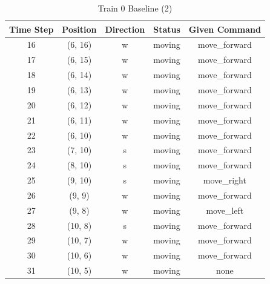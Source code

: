 \begin{table}
\centering
\scriptsize
\caption{Train 0 Baseline (2)}
\label{tab:base0}
\begin{tabular}{c c c c c}
\hline
\textbf{Time Step} & \textbf{Position} & \textbf{Direction} & \textbf{Status} & \textbf{Given Command} \\
\hline
16 & (6, 16) & w & moving & move\_forward \\
17 & (6, 15) & w & moving & move\_forward \\
18 & (6, 14) & w & moving & move\_forward \\
19 & (6, 13) & w & moving & move\_forward \\
20 & (6, 12) & w & moving & move\_forward \\
21 & (6, 11) & w & moving & move\_forward \\
22 & (6, 10) & w & moving & move\_forward \\
23 & (7, 10) & s & moving & move\_forward \\
24 & (8, 10) & s & moving & move\_forward \\
25 & (9, 10) & s & moving & move\_right \\
26 & (9, 9) & w & moving & move\_forward \\
27 & (9, 8) & w & moving & move\_left \\
28 & (10, 8) & s & moving & move\_forward \\
29 & (10, 7) & w & moving & move\_forward \\
30 & (10, 6) & w & moving & move\_forward \\
31 & (10, 5) & w & moving & none \\
\hline
\end{tabular}
\end{table}